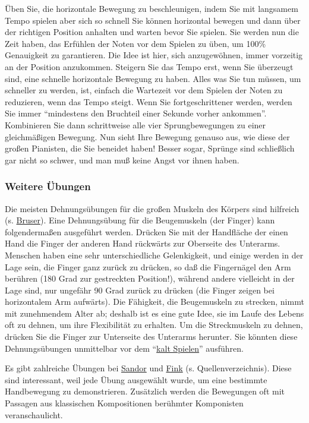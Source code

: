 Üben Sie, die horizontale Bewegung zu beschleunigen, indem Sie mit langsamem Tempo spielen aber sich so schnell Sie können horizontal bewegen und dann über der richtigen Position anhalten und warten bevor Sie spielen.
Sie werden nun die Zeit haben, das Erfühlen der Noten vor dem Spielen zu üben, um 100\% Genauigkeit zu garantieren.
Die Idee ist hier, sich anzugewöhnen, immer vorzeitig an der Position anzukommen.
Steigern Sie das Tempo erst, wenn Sie überzeugt sind, eine schnelle horizontale Bewegung zu haben.
Alles was Sie tun müssen, um schneller zu werden, ist, einfach die Wartezeit vor dem Spielen der Noten zu reduzieren, wenn das Tempo steigt.
Wenn Sie fortgeschrittener werden, werden Sie immer \enquote{mindestens den Bruchteil einer Sekunde vorher ankommen}.
Kombinieren Sie dann schrittweise alle vier Sprungbewegungen zu einer gleichmäßigen Bewegung.
Nun sieht Ihre Bewegung genauso aus, wie diese der großen Pianisten, die Sie beneidet haben!
Besser sogar, Sprünge sind schließlich gar nicht so schwer, und man muß keine Angst vor ihnen haben.
 

\subsubsection{Weitere Übungen}
\label{c1iii7g}

Die meisten Dehnungsübungen für die großen Muskeln des Körpers sind hilfreich (s. \hyperref[Bruser]{Bruser}).
Eine Dehnungsübung für die Beugemuskeln (der Finger) kann folgendermaßen ausgeführt werden.
Drücken Sie mit der Handfläche der einen Hand die Finger der anderen Hand rückwärts zur Oberseite des Unterarms.
Menschen haben eine sehr unterschiedliche Gelenkigkeit, und einige werden in der Lage sein, die Finger ganz zurück zu drücken, so daß die Fingernägel den Arm berühren (180 Grad zur gestreckten Position!), während andere vielleicht in der Lage sind, nur ungefähr 90 Grad zurück zu drücken (die Finger zeigen bei horizontalem Arm aufwärts).
Die Fähigkeit, die Beugemuskeln zu strecken, nimmt mit zunehmendem Alter ab; deshalb ist es eine gute Idee, sie im Laufe des Lebens oft zu dehnen, um ihre Flexibilität zu erhalten.
Um die Streckmuskeln zu dehnen, drücken Sie die Finger zur Unterseite des Unterarms herunter.
Sie könnten diese Dehnungsübungen unmittelbar vor dem \enquote{\hyperref[c1iii6g]{kalt Spielen}} ausführen.

 Es gibt zahlreiche Übungen bei \hyperref[Sandor]{Sandor} und \hyperref[Fink]{Fink} (s. Quellenverzeichnis).
Diese sind interessant, weil jede Übung ausgewählt wurde, um eine bestimmte Handbewegung zu demonstrieren.
Zusätzlich werden die Bewegungen oft mit Passagen aus klassischen Kompositionen berühmter Komponisten veranschaulicht.




